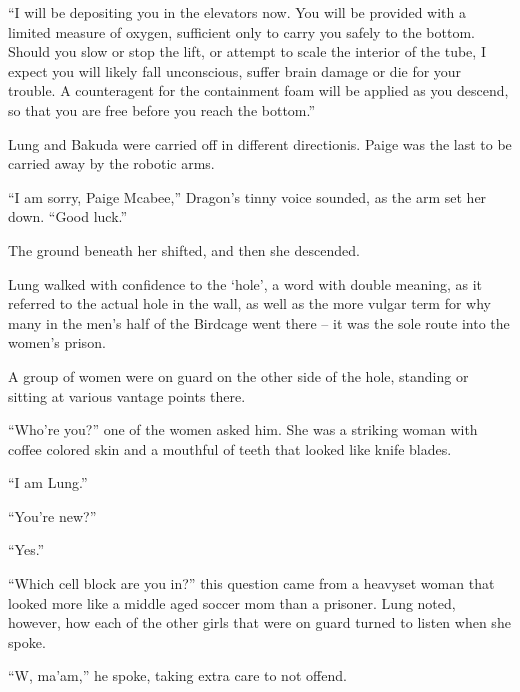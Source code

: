 ``I will be depositing you in the elevators now.  You will be provided with a limited measure of oxygen, sufficient only to carry you safely to the bottom.  Should you slow or stop the lift, or attempt to scale the interior of the tube, I expect you will likely fall unconscious, suffer brain damage or die for your trouble.  A counteragent for the containment foam will be applied as you descend, so that you are free before you reach the bottom.''



Lung and Bakuda were carried off in different directionis.  Paige was the last to be carried away by the robotic arms.



``I am sorry, Paige Mcabee,'' Dragon's tinny voice sounded, as the arm set her down.  ``Good luck.''



The ground beneath her shifted, and then she descended.



\blacksquare



Lung walked with confidence to the `hole', a word with double meaning, as it referred to the actual hole in the wall, as well as the more vulgar term for why many in the men's half of the Birdcage went there – it was the sole route into the women's prison.



A group of women were on guard on the other side of the hole, standing or sitting at various vantage points there.



``Who're you?'' one of the women asked him.  She was a striking woman with coffee colored skin and a mouthful of teeth that looked like knife blades.



``I am Lung.''



``You're new?''



``Yes.''



``Which cell block are you in?'' this question came from a heavyset woman that looked more like a middle aged soccer mom than a prisoner.  Lung noted, however, how each of the other girls that were on guard turned to listen when she spoke.



``W, ma'am,'' he spoke, taking extra care to not offend.



